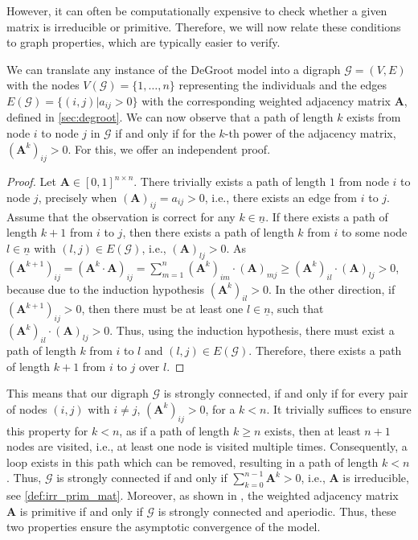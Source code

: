 \documentclass[journal,compsoc,10pt]{IEEEtran}
\newcommand{\gG}{\mathcal{G}}
\renewcommand{\vec}[1]{\bm{#1}}        %
\newcommand{\mat}[1]{\bm{#1}}          %
\begin{document}
However, it can often be computationally expensive to check whether a given matrix is irreducible or primitive. Therefore, we will now relate these conditions to graph properties, which are typically easier to verify.

We can translate any instance of the DeGroot model into a digraph $\gG=(V,E)$ with the nodes $V(\gG) = \{1, \dots,n\}$ representing the individuals and the edges $E(\gG) = \{(i,j)|a_{ij} > 0\}$ with the corresponding weighted adjacency matrix $\mat A$, defined in \cref{sec:degroot}. We can now observe that a path of length $k$ exists from node $i$ to node $j$ in $\gG$ if and only if for the $k$-th power of the adjacency matrix, $(\mat A^k)_{ij} > 0$. For this, we offer an independent proof.

\begin{proof}
    Let $\mat A\in[0,1]^{n\times n}$. There trivially exists a path of length $1$ from node $i$ to node $j$, precisely when $(\mat A)_{ij}=a_{ij}>0$, i.e., there exists an edge from $i$ to $j$. Assume that the observation is correct for any $k\in \underline{n}$. If there exists a path of length $k+1$ from $i$ to $j$, then there exists a path of length $k$ from $i$ to some node $l\in\underline{n}$ with $(l,j)\in E(\gG)$, i.e., $(\mat A)_{lj}>0$. As $(\mat A^{k+1})_{ij} = (\mat A^k\cdot \mat A)_{ij} = \sum_{m=1}^{n}(\mat A^k)_{im}\cdot (\mat A)_{mj} \geq (\mat A^k)_{il}\cdot (\mat A)_{lj}>0$, because due to the induction hypothesis $(\mat A^k)_{il}>0$. In the other direction, if $(\mat A^{k+1})_{ij}>0$, then there must be at least one $l\in \underline{n}$, such that $(\mat A^k)_{il}\cdot (\mat A)_{lj} >0$. Thus, using the induction hypothesis, there must exist a path of length $k$ from $i$ to $l$ and $(l,j)\in E(\gG)$. Therefore, there exists a path of length $k+1$ from $i$ to $j$ over $l$.
\end{proof}

This means that our digraph $\gG$ is strongly connected, if and only if for every pair of nodes $(i,j)$ with $i\neq j$, $(\mat A^k)_{ij}>0$, for a $k<n$. It trivially suffices to ensure this property for $k<n$, as if a path of length $k\geq n$ exists, then at least $n+1$ nodes are visited, i.e., at least one node is visited multiple times. Consequently, a loop exists in this path which can be removed, resulting in a path of length $k<n$. Thus, $\gG$ is strongly connected if and only if $\sum_{k=0}^{n-1}\mat A^k > 0$, i.e., $\mat A$ is irreducible, see \cref{def:irr_prim_mat}. Moreover, as shown in \cite{Bullo_lecture}, the weighted adjacency matrix $\mat A$ is primitive if and only if $\gG$ is strongly connected and aperiodic. Thus, these two properties ensure the asymptotic convergence of the model.
\end{document}
